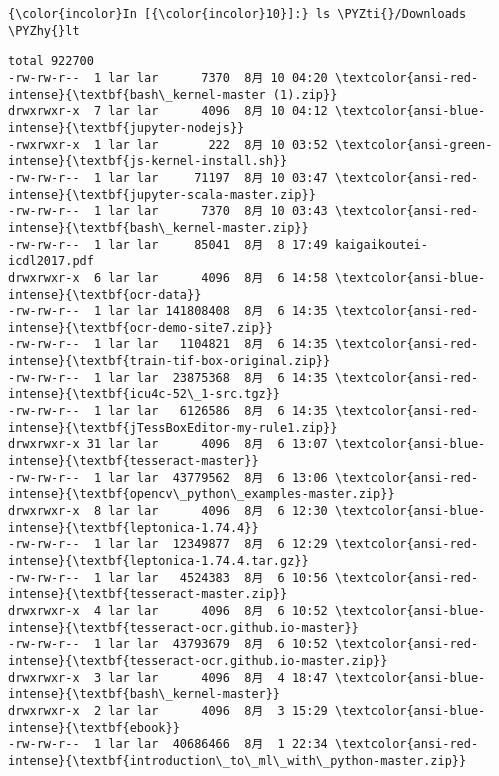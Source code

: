 \documentclass[11pt]{article}
\def\PYZhy{\char`\-}
\def\PYZti{\char`\~}
\begin{document}
    \begin{Verbatim}[commandchars=\\\{\}]
{\color{incolor}In [{\color{incolor}10}]:} ls \PYZti{}/Downloads \PYZhy{}lt
\end{Verbatim}

    \begin{Verbatim}[commandchars=\\\{\}]
total 922700
-rw-rw-r--  1 lar lar      7370  8月 10 04:20 \textcolor{ansi-red-intense}{\textbf{bash\_kernel-master (1).zip}}
drwxrwxr-x  7 lar lar      4096  8月 10 04:12 \textcolor{ansi-blue-intense}{\textbf{jupyter-nodejs}}
-rwxrwxr-x  1 lar lar       222  8月 10 03:52 \textcolor{ansi-green-intense}{\textbf{js-kernel-install.sh}}
-rw-rw-r--  1 lar lar     71197  8月 10 03:47 \textcolor{ansi-red-intense}{\textbf{jupyter-scala-master.zip}}
-rw-rw-r--  1 lar lar      7370  8月 10 03:43 \textcolor{ansi-red-intense}{\textbf{bash\_kernel-master.zip}}
-rw-rw-r--  1 lar lar     85041  8月  8 17:49 kaigaikoutei-icdl2017.pdf
drwxrwxr-x  6 lar lar      4096  8月  6 14:58 \textcolor{ansi-blue-intense}{\textbf{ocr-data}}
-rw-rw-r--  1 lar lar 141808408  8月  6 14:35 \textcolor{ansi-red-intense}{\textbf{ocr-demo-site7.zip}}
-rw-rw-r--  1 lar lar   1104821  8月  6 14:35 \textcolor{ansi-red-intense}{\textbf{train-tif-box-original.zip}}
-rw-rw-r--  1 lar lar  23875368  8月  6 14:35 \textcolor{ansi-red-intense}{\textbf{icu4c-52\_1-src.tgz}}
-rw-rw-r--  1 lar lar   6126586  8月  6 14:35 \textcolor{ansi-red-intense}{\textbf{jTessBoxEditor-my-rule1.zip}}
drwxrwxr-x 31 lar lar      4096  8月  6 13:07 \textcolor{ansi-blue-intense}{\textbf{tesseract-master}}
-rw-rw-r--  1 lar lar  43779562  8月  6 13:06 \textcolor{ansi-red-intense}{\textbf{opencv\_python\_examples-master.zip}}
drwxrwxr-x  8 lar lar      4096  8月  6 12:30 \textcolor{ansi-blue-intense}{\textbf{leptonica-1.74.4}}
-rw-rw-r--  1 lar lar  12349877  8月  6 12:29 \textcolor{ansi-red-intense}{\textbf{leptonica-1.74.4.tar.gz}}
-rw-rw-r--  1 lar lar   4524383  8月  6 10:56 \textcolor{ansi-red-intense}{\textbf{tesseract-master.zip}}
drwxrwxr-x  4 lar lar      4096  8月  6 10:52 \textcolor{ansi-blue-intense}{\textbf{tesseract-ocr.github.io-master}}
-rw-rw-r--  1 lar lar  43793679  8月  6 10:52 \textcolor{ansi-red-intense}{\textbf{tesseract-ocr.github.io-master.zip}}
drwxrwxr-x  3 lar lar      4096  8月  4 18:47 \textcolor{ansi-blue-intense}{\textbf{bash\_kernel-master}}
drwxrwxr-x  2 lar lar      4096  8月  3 15:29 \textcolor{ansi-blue-intense}{\textbf{ebook}}
-rw-rw-r--  1 lar lar  40686466  8月  1 22:34 \textcolor{ansi-red-intense}{\textbf{introduction\_to\_ml\_with\_python-master.zip}}

\end{Verbatim}
\end{document}

